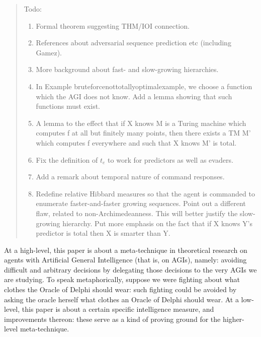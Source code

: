 \documentclass{article}
\begin{document}
\begin{quote}
    Todo:
    \begin{enumerate}
        \item Formal theorem suggesting THM/IOI connection.
        \item References about adversarial sequence prediction etc (including Gamez).
        \item More background about fast- and slow-growing hierarchies.
        \item In Example bruteforcenottotallyoptimalexample, we choose a function which
            the AGI does not know. Add a lemma showing that such functions must exist.
        \item A lemma to the effect that if X knows M is a Turing machine which computes
            f at all but finitely many points, then there exists a TM M' which computes
            f everywhere and such that X knows M' is total.
        \item Fix the definition of $t_e$ to work for predictors as well as evaders.
        \item Add a remark about temporal nature of command responses.
        \item Redefine relative Hibbard measures so that the agent is commanded to
            enumerate faster-and-faster growing sequences. Point out a different flaw,
            related to non-Archimedeanness. This will better justify the slow-growing
            hierarchy. Put more emphasis on the fact that if X knows Y's predictor is
            total then X is smarter than Y.
    \end{enumerate}
\end{quote}

At a high-level, this paper is about a meta-technique in theoretical research
on agents with Artificial General Intelligence (that is, on AGIs), namely:
avoiding difficult and arbitrary decisions by delegating those decisions to the
very AGIs we are studying. To speak metaphorically, suppose we were fighting about
what clothes the Oracle of Delphi should wear: such fighting could be avoided
by asking the oracle herself what clothes an Oracle of Delphi should wear. At
a low-level, this paper is about a certain specific intelligence measure, and
improvements thereon: these serve as a kind of proving ground for the
higher-level meta-technique.
\end{document}

